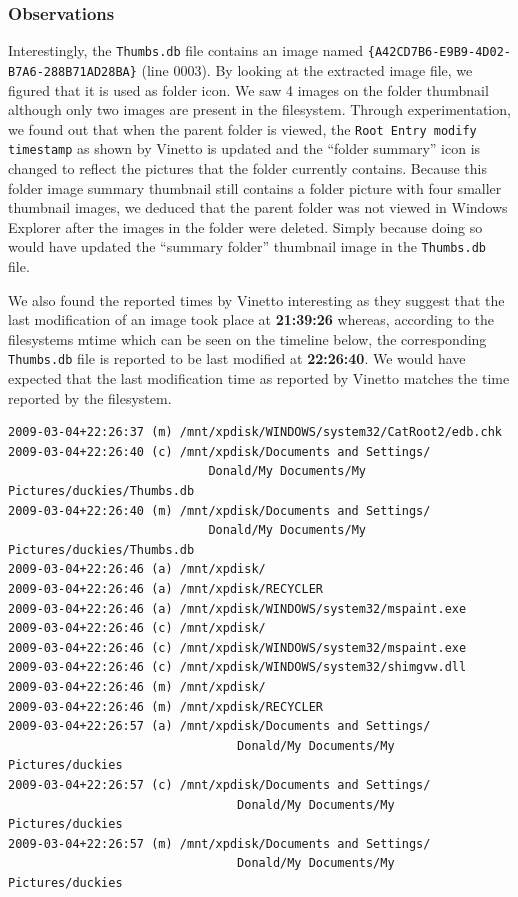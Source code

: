 \documentclass[a4paper,
    11pt,
    normalheadings,
    parindent,
    UKenglish,
    abstracton,
    ]{scrartcl}
\begin{document}
\subsubsection{Observations}
Interestingly, the {\tt Thumbs.db} file contains an image named
\texttt{\{A42CD7B6-E9B9-4D02-B7A6-288B71AD28BA\}}
(line 0003).
By looking at the extracted image file, we figured that it is used as folder icon.
We saw 4 images on the folder thumbnail although only two images are present in the filesystem.
Through experimentation, we found out that when the parent folder is viewed, the \texttt{Root Entry modify timestamp} as shown by Vinetto is updated and the ``folder summary'' icon is changed to reflect the pictures that the folder currently contains.
Because this folder image summary thumbnail still contains a folder picture with four smaller thumbnail images, we deduced that the parent folder was not viewed in Windows Explorer after the images in the folder were deleted.
Simply because doing so would have updated the ``summary folder'' thumbnail image in the \texttt{Thumbs.db} file.



We also found the reported times by Vinetto interesting as they suggest that the last modification of an image took place at \textbf{21:39:26} whereas, according to the filesystems mtime which can be seen on the timeline below, the corresponding \texttt{Thumbs.db} file is reported to be last modified at \textbf{22:26:40}.
We would have expected that the last modification time as reported by Vinetto matches the time reported by the filesystem.
\begin{verbatim}
2009-03-04+22:26:37 (m) /mnt/xpdisk/WINDOWS/system32/CatRoot2/edb.chk
2009-03-04+22:26:40 (c) /mnt/xpdisk/Documents and Settings/
                            Donald/My Documents/My Pictures/duckies/Thumbs.db
2009-03-04+22:26:40 (m) /mnt/xpdisk/Documents and Settings/
                            Donald/My Documents/My Pictures/duckies/Thumbs.db
2009-03-04+22:26:46 (a) /mnt/xpdisk/
2009-03-04+22:26:46 (a) /mnt/xpdisk/RECYCLER
2009-03-04+22:26:46 (a) /mnt/xpdisk/WINDOWS/system32/mspaint.exe
2009-03-04+22:26:46 (c) /mnt/xpdisk/
2009-03-04+22:26:46 (c) /mnt/xpdisk/WINDOWS/system32/mspaint.exe
2009-03-04+22:26:46 (c) /mnt/xpdisk/WINDOWS/system32/shimgvw.dll
2009-03-04+22:26:46 (m) /mnt/xpdisk/
2009-03-04+22:26:46 (m) /mnt/xpdisk/RECYCLER
2009-03-04+22:26:57 (a) /mnt/xpdisk/Documents and Settings/
                                Donald/My Documents/My Pictures/duckies
2009-03-04+22:26:57 (c) /mnt/xpdisk/Documents and Settings/
                                Donald/My Documents/My Pictures/duckies
2009-03-04+22:26:57 (m) /mnt/xpdisk/Documents and Settings/
                                Donald/My Documents/My Pictures/duckies
\end{verbatim}
\end{document}
